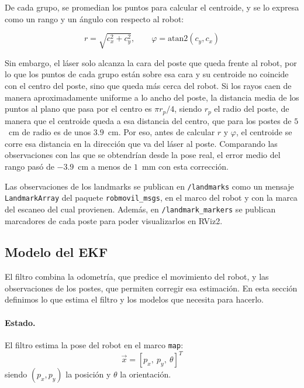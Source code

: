 \documentclass[11pt,a4paper]{article}
\begin{document}
De cada grupo, se promedian los puntos para calcular el centroide, y se lo expresa como un rango y un ángulo con respecto al robot:

\begin{equation}
r = \sqrt{c_x^2 + c_y^2}, \qquad \varphi = \mathrm{atan2}(c_y, c_x)
\end{equation}

Sin embargo, el láser solo alcanza la cara del poste que queda frente al robot, por lo que los puntos de cada grupo están sobre esa cara y su centroide no coincide con el centro del poste, sino que queda más cerca del robot. Si los rayos caen de manera aproximadamente uniforme a lo ancho del poste, la distancia media de los puntos al plano que pasa por el centro es $\pi r_p/4$, siendo $r_p$ el radio del poste, de manera que el centroide queda a esa distancia del centro, que para los postes de $5$~cm de radio es de unos $3.9$~cm. Por eso, antes de calcular $r$ y $\varphi$, el centroide se corre esa distancia en la dirección que va del láser al poste. Comparando las observaciones con las que se obtendrían desde la pose real, el error medio del rango pasó de $-3.9$~cm a menos de $1$~mm con esta corrección.

Las observaciones de los landmarks se publican en \texttt{/landmarks} como un mensaje \texttt{LandmarkArray} del paquete \texttt{robmovil\_msgs}, en el marco del robot y con la marca del escaneo del cual provienen. Además, en \texttt{/landmark\_markers} se publican marcadores de cada poste para poder visualizarlos en RViz2.

\subsection{Modelo del EKF}
\label{sec:modelo_ekf}

El filtro combina la odometría, que predice el movimiento del robot, y las observaciones de los postes, que permiten corregir esa estimación. En esta sección definimos lo que estima el filtro y los modelos que necesita para hacerlo. 

\paragraph{Estado.} El filtro estima la pose del robot en el marco \texttt{map}:
\begin{equation}
\vec{x} = [p_x,\ p_y,\ \theta]^T
\end{equation} 
siendo $(p_x, p_y)$ la posición y $\theta$ la orientación.
\end{document}
